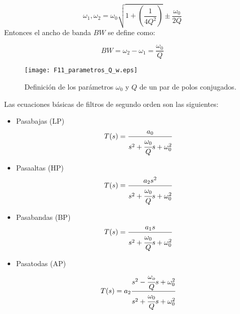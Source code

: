 	\begin{equation}
		\omega_{1},\omega_{2} = \omega_{0} \sqrt{1 + \left( \frac{1}{4 Q^{2}} \right)}  \pm \frac{\omega_{0}}{2 Q}
	\end{equation}
	Entonces el ancho de banda $BW$ se define como:
	
	\begin{equation}
	BW = \omega_{2} - \omega_{1} = \frac{\omega_{0}}{Q}
	\end{equation}
	
	
	\begin{figure}[hbtp]
		\caption{Definición de los parámetros $\omega_{0}$ y $Q$ de un par de polos conjugados.} 
		\label{fig:F11_parametros_Q_w}
		\centering
		\texttt{[image: F11\_parametros\_Q\_w.eps]}
	\end{figure}
	
	Las ecuaciones básicas de filtros de segundo orden son las siguientes:
	\begin{itemize}
	\item Pasabajas (LP)
	\begin{equation}
	T(s) = \frac{a_{0}}{s^{2} + \cfrac{\omega_{0}}{Q} s + \omega_{0}^{2}}
	\end{equation}
	
	\item Pasaaltas (HP)
	\begin{equation}
	T(s) = \frac{a_{2} s^{2}}{s^{2} + \cfrac{\omega_{0}}{Q} s + \omega_{0}^{2}}
	\end{equation}
	
	\item Pasabandas (BP)
	\begin{equation}
	T(s) = \frac{a_{1} s}{s^{2} + \cfrac{\omega_{0}}{Q} s + \omega_{0}^{2}}
	\end{equation}
	
	\item Pasatodas (AP)
	\begin{equation}
	T(s) = a_{2} \frac{s^{2} - \cfrac{\omega_{o}}{Q}s + \omega_{0}^{2} }{s^{2} + \cfrac{\omega_{0}}{Q} s + \omega_{0}^{2}}
	\end{equation}
	\end{itemize}
	
